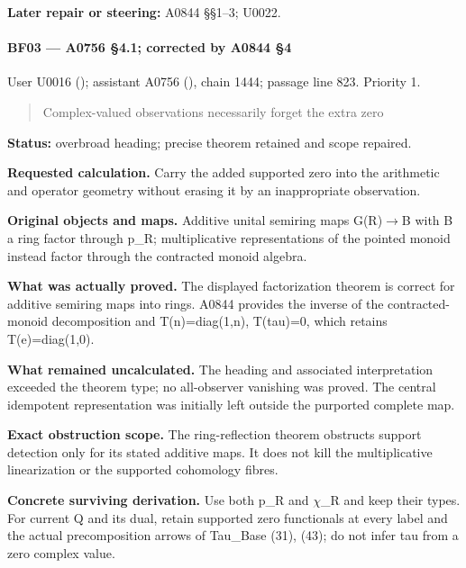 \textbf{Later repair or steering:} A0844 §§1--3; U0022.

\paragraph{BF03 --- A0756 §4.1; corrected by A0844
§4}\label{bf03-a0756-4.1-corrected-by-a0844-4}

User U0016 (\protect{});
assistant A0756 (\protect{}),
chain 1444; passage line 823. Priority 1.

\begin{quote}
Complex-valued observations necessarily forget the extra zero
\end{quote}

\textbf{Status:} overbroad heading; precise theorem retained and scope
repaired.

\textbf{Requested calculation.} Carry the added supported zero into the
arithmetic and operator geometry without erasing it by an inappropriate
observation.

\textbf{Original objects and maps.} Additive unital semiring maps
G(R)\allowbreak{}\ensuremath{→}\allowbreak{}B with B a ring factor
through p\_R; multiplicative representations of the pointed monoid
instead factor through the contracted monoid algebra.

\textbf{What was actually proved.} The displayed factorization theorem
is correct for additive semiring maps into rings. A0844 provides the
inverse of the contracted-monoid decomposition and T(n)=diag(1,n),
T(tau)=0, which retains T(e)=diag(1,0).

\textbf{What remained uncalculated.} The heading and associated
interpretation exceeded the theorem type; no all-observer vanishing was
proved. The central idempotent representation was initially left outside
the purported complete map.

\textbf{Exact obstruction scope.} The ring-reflection theorem obstructs
support detection only for its stated additive maps. It does not kill
the multiplicative linearization or the supported cohomology fibres.

\textbf{Concrete surviving derivation.} Use both p\_R and
\allowbreak{}\ensuremath{χ}\allowbreak{}\_R and keep their types. For
current Q and its dual, retain supported zero functionals at every label
and the actual precomposition arrows of Tau\_Base (31), (43); do not
infer tau from a zero complex value.

